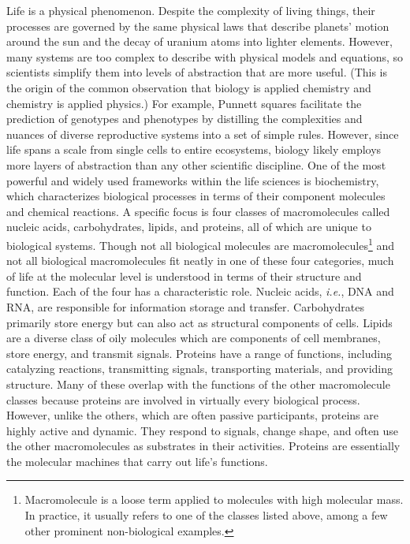 Life is a physical phenomenon. Despite the complexity of living things, their processes are governed by the same physical laws that describe planets' motion around the sun and the decay of uranium atoms into lighter elements. However, many systems are too complex to describe with physical models and equations, so scientists simplify them into levels of abstraction that are more useful. (This is the origin of the common observation that biology is applied chemistry and chemistry is applied physics.) For example, Punnett squares facilitate the prediction of genotypes and phenotypes by distilling the complexities and nuances of diverse reproductive systems into a set of simple rules. However, since life spans a scale from single cells to entire ecosystems, biology likely employs more layers of abstraction than any other scientific discipline. One of the most powerful and widely used frameworks within the life sciences is biochemistry, which characterizes biological processes in terms of their component molecules and chemical reactions. A specific focus is four classes of macromolecules called nucleic acids, carbohydrates, lipids, and proteins, all of which are unique to biological systems. Though not all biological molecules are macromolecules\footnote{Macromolecule is a loose term applied to molecules with high molecular mass. In practice, it usually refers to one of the classes listed above, among a few other prominent non-biological examples.} and not all biological macromolecules fit neatly in one of these four categories, much of life at the molecular level is understood in terms of their structure and function. Each of the four has a characteristic role. Nucleic acids, \textit{i.e.}, DNA and RNA, are responsible for information storage and transfer. Carbohydrates primarily store energy but can also act as structural components of cells. Lipids are a diverse class of oily molecules which are components of cell membranes, store energy, and transmit signals. Proteins have a range of functions, including catalyzing reactions, transmitting signals, transporting materials, and providing structure. Many of these overlap with the functions of the other macromolecule classes because proteins are involved in virtually every biological process. However, unlike the others, which are often passive participants, proteins are highly active and dynamic. They respond to signals, change shape, and often use the other macromolecules as substrates in their activities. Proteins are essentially the molecular machines that carry out life's functions.

